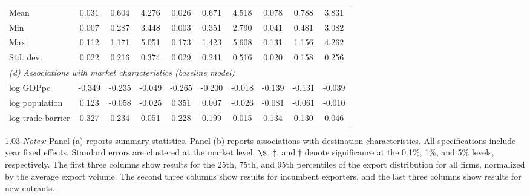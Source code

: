 \begin{table}[h!]
\begin{center}
\begin{tabular}{lccccccccc}
Mean& 0.031& 0.604& 4.276& 0.026& 0.671& 4.518& 0.078& 0.788& 3.831\\
Min& 0.007& 0.287& 3.448& 0.003& 0.351& 2.790& 0.041& 0.481& 3.082\\
Max& 0.112& 1.171& 5.051& 0.173& 1.423& 5.608& 0.131& 1.156& 4.262\\
Std. dev.& 0.022& 0.216& 0.374& 0.029& 0.241& 0.516& 0.020& 0.158& 0.256\\
\midrule\multicolumn{10}{l}{\textit{(d) Associations with market characteristics (baseline model)}}\\[4pt]
log GDPpc& -0.349& -0.235& -0.049& -0.265& -0.200& -0.018& -0.139& -0.131& -0.039\\
log population& 0.123& -0.058& -0.025& 0.351& 0.007& -0.026& -0.081& -0.061& -0.010\\
log trade barrier& 0.327& 0.234& 0.051& 0.228& 0.199& 0.015& 0.134& 0.130& 0.046\\
\bottomrule
\end{tabular}
\vspace{-0.1cm}
\begin{fignote2}{1.03\textwidth}
\textit{Notes:} Panel (a) reports summary statistics. Panel (b) reports associations with destination characteristics. All specifications include year fixed effects. Standard errors are clustered at the market level. $\S$, $\ddagger$, and $\dagger$ denote significance at the 0.1\%, 1\%, and 5\% levels, respectively. The first three columns show results for the 25th, 75th, and 95th percentiles of the export distribution for all firms, normalized by the average export volume. The second three columns show results for incumbent exporters, and the last three columns show results for new entrants.
\end{fignote2}
\end{center}
\normalsize
\end{table}
